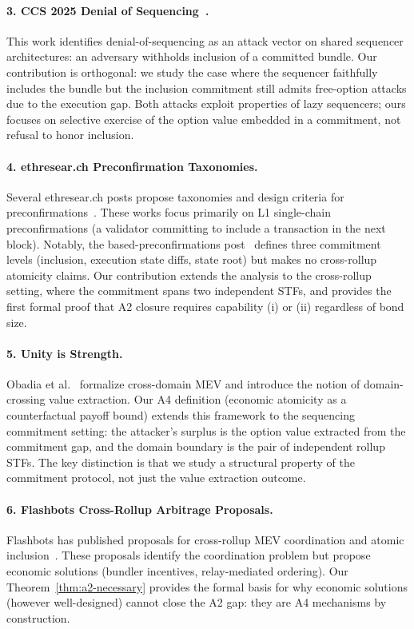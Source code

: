 \paragraph{3. CCS 2025 Denial of Sequencing~\cite{ccs2025dos}.}
This work identifies denial-of-sequencing as an attack vector on shared
sequencer architectures: an adversary withholds inclusion of a committed
bundle. Our contribution is orthogonal: we study the case where the
sequencer faithfully includes the bundle but the inclusion commitment still
admits free-option attacks due to the execution gap. Both attacks exploit
properties of lazy sequencers; ours focuses on selective exercise of the
option value embedded in a commitment, not refusal to honor inclusion.

\paragraph{4. ethresear.ch Preconfirmation Taxonomies.}
Several ethresear.ch posts propose taxonomies and design criteria for
preconfirmations~\cite{Drake2023-BasedPreconf, Drake2023-BasedRollups,
Drake2023-ExecTickets}. These works focus primarily on L1 single-chain
preconfirmations (a validator committing to include a transaction in the
next block). Notably, the based-preconfirmations post~\cite{Drake2023-BasedPreconf}
defines three commitment levels (inclusion, execution state diffs, state root)
but makes no cross-rollup atomicity claims. Our contribution extends the
analysis to the cross-rollup setting, where the commitment spans two
independent STFs, and provides the first formal proof that A2 closure
requires capability (i) or (ii) regardless of bond size.

\paragraph{5. Unity is Strength.}
Obadia et al.~\cite{obadia2021unity} formalize cross-domain MEV and introduce
the notion of domain-crossing value extraction. Our A4 definition (economic
atomicity as a counterfactual payoff bound) extends this framework to the
sequencing commitment setting: the attacker's surplus is the option value
extracted from the commitment gap, and the domain boundary is the pair of
independent rollup STFs. The key distinction is that we study a structural
property of the commitment protocol, not just the value extraction outcome.

\paragraph{6. Flashbots Cross-Rollup Arbitrage Proposals.}
Flashbots has published proposals for cross-rollup MEV coordination and atomic
inclusion~\cite{flashbots2021mev, obadia2021unity}. These proposals identify
the coordination problem but propose economic solutions (bundler incentives,
relay-mediated ordering). Our Theorem~\ref{thm:a2-necessary} provides the
formal basis for why economic solutions (however well-designed) cannot close
the A2 gap: they are A4 mechanisms by construction.

